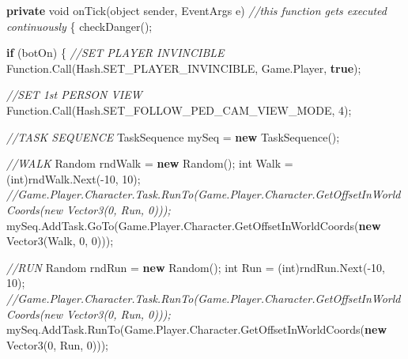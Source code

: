 \documentclass[
  openany]{book}
\newenvironment{Shaded}{\begin{snugshade}}{\end{snugshade}}
\newcommand{\CommentTok}[1]{\textcolor[rgb]{0.56,0.35,0.01}{\textit{#1}}}
\newcommand{\DataTypeTok}[1]{\textcolor[rgb]{0.13,0.29,0.53}{#1}}
\newcommand{\DecValTok}[1]{\textcolor[rgb]{0.00,0.00,0.81}{#1}}
\newcommand{\FunctionTok}[1]{\textcolor[rgb]{0.00,0.00,0.00}{#1}}
\newcommand{\KeywordTok}[1]{\textcolor[rgb]{0.13,0.29,0.53}{\textbf{#1}}}
\newcommand{\NormalTok}[1]{#1}
\begin{document}
\begin{Shaded}
\begin{Highlighting}[]
        \KeywordTok{private} \DataTypeTok{void} \FunctionTok{onTick}\NormalTok{(}\DataTypeTok{object}\NormalTok{ sender, EventArgs e) }\CommentTok{//this function gets executed continuously }
\NormalTok{        \{}
            \FunctionTok{checkDanger}\NormalTok{();}

            \KeywordTok{if}\NormalTok{ (botOn)}
\NormalTok{            \{}
                \CommentTok{//SET PLAYER INVINCIBLE}
\NormalTok{                Function.}\FunctionTok{Call}\NormalTok{(Hash.}\FunctionTok{SET_PLAYER_INVINCIBLE}\NormalTok{, Game.}\FunctionTok{Player}\NormalTok{, }\KeywordTok{true}\NormalTok{);}

                \CommentTok{//SET 1st PERSON VIEW}
\NormalTok{                Function.}\FunctionTok{Call}\NormalTok{(Hash.}\FunctionTok{SET_FOLLOW_PED_CAM_VIEW_MODE}\NormalTok{, }\DecValTok{4}\NormalTok{);}

                \CommentTok{//TASK SEQUENCE}
\NormalTok{                TaskSequence mySeq = }\KeywordTok{new} \FunctionTok{TaskSequence}\NormalTok{();}

                \CommentTok{//WALK}
\NormalTok{                Random rndWalk = }\KeywordTok{new} \FunctionTok{Random}\NormalTok{();}
                \DataTypeTok{int}\NormalTok{ Walk = (}\DataTypeTok{int}\NormalTok{)rndWalk.}\FunctionTok{Next}\NormalTok{(-}\DecValTok{10}\NormalTok{, }\DecValTok{10}\NormalTok{);}
                \CommentTok{//Game.Player.Character.Task.RunTo(Game.Player.Character.GetOffsetInWorldCoords(new Vector3(0, Run, 0)));}
\NormalTok{                mySeq.}\FunctionTok{AddTask}\NormalTok{.}\FunctionTok{GoTo}\NormalTok{(Game.}\FunctionTok{Player}\NormalTok{.}\FunctionTok{Character}\NormalTok{.}\FunctionTok{GetOffsetInWorldCoords}\NormalTok{(}\KeywordTok{new} \FunctionTok{Vector3}\NormalTok{(Walk, }\DecValTok{0}\NormalTok{, }\DecValTok{0}\NormalTok{)));}

                \CommentTok{//RUN}
\NormalTok{                Random rndRun = }\KeywordTok{new} \FunctionTok{Random}\NormalTok{();}
                \DataTypeTok{int}\NormalTok{ Run = (}\DataTypeTok{int}\NormalTok{)rndRun.}\FunctionTok{Next}\NormalTok{(-}\DecValTok{10}\NormalTok{, }\DecValTok{10}\NormalTok{);}
                \CommentTok{//Game.Player.Character.Task.RunTo(Game.Player.Character.GetOffsetInWorldCoords(new Vector3(0, Run, 0)));}
\NormalTok{                mySeq.}\FunctionTok{AddTask}\NormalTok{.}\FunctionTok{RunTo}\NormalTok{(Game.}\FunctionTok{Player}\NormalTok{.}\FunctionTok{Character}\NormalTok{.}\FunctionTok{GetOffsetInWorldCoords}\NormalTok{(}\KeywordTok{new} \FunctionTok{Vector3}\NormalTok{(}\DecValTok{0}\NormalTok{, Run, }\DecValTok{0}\NormalTok{)));}


\end{Highlighting}
\end{Shaded}
\end{document}
